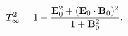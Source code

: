 \begin{equation}\label{vacf1}
\dot T_\infty^{2}= 1-\frac{{\bf E}_{0}^{2} + 
({\bf E}_0\cdot {\bf B}_0)^2}{1+{\bf B}_{0}^{2}}.
\end{equation}

